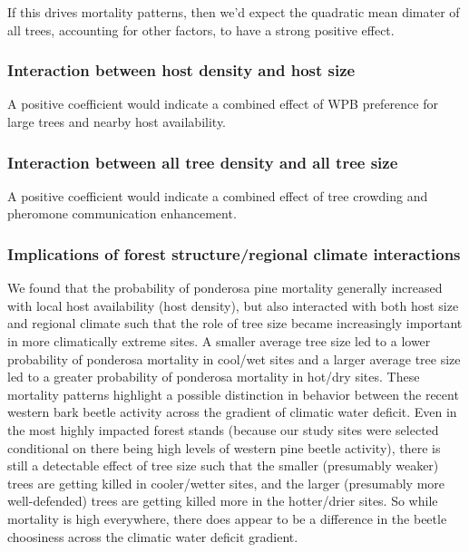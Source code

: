 \documentclass[]{article}
\begin{document}
If this drives mortality patterns, then we'd expect the quadratic mean
dimater of all trees, accounting for other factors, to have a strong
positive effect.

\subsubsection{Interaction between host density and host
size}\label{interaction-between-host-density-and-host-size}

A positive coefficient would indicate a combined effect of WPB
preference for large trees and nearby host availability.

\subsubsection{Interaction between all tree density and all tree
size}\label{interaction-between-all-tree-density-and-all-tree-size}

A positive coefficient would indicate a combined effect of tree crowding
and pheromone communication enhancement.

\subsubsection{Implications of forest structure/regional climate
interactions}\label{implications-of-forest-structureregional-climate-interactions}

We found that the probability of ponderosa pine mortality generally
increased with local host availability (host density), but also
interacted with both host size and regional climate such that the role
of tree size became increasingly important in more climatically extreme
sites. A smaller average tree size led to a lower probability of
ponderosa mortality in cool/wet sites and a larger average tree size led
to a greater probability of ponderosa mortality in hot/dry sites. These
mortality patterns highlight a possible distinction in behavior between
the recent western bark beetle activity across the gradient of climatic
water deficit. Even in the most highly impacted forest stands (because
our study sites were selected conditional on there being high levels of
western pine beetle activity), there is still a detectable effect of
tree size such that the smaller (presumably weaker) trees are getting
killed in cooler/wetter sites, and the larger (presumably more
well-defended) trees are getting killed more in the hotter/drier sites.
So while mortality is high everywhere, there does appear to be a
difference in the beetle choosiness across the climatic water deficit
gradient.
\end{document}
